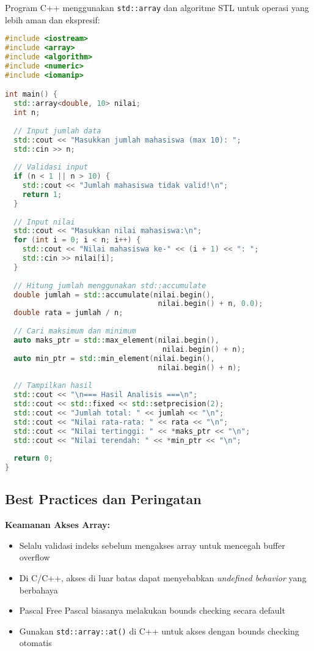 \documentclass[../main.tex]{subfiles}
\begin{document}
Program C++ menggunakan \texttt{std::array} dan algoritme STL untuk operasi yang lebih aman dan ekspresif:

\begin{lstlisting}[language=C++, caption={Program lengkap array 1D di C++}]
#include <iostream>
#include <array>
#include <algorithm>
#include <numeric>
#include <iomanip>

int main() {
  std::array<double, 10> nilai;
  int n;
  
  // Input jumlah data
  std::cout << "Masukkan jumlah mahasiswa (max 10): ";
  std::cin >> n;
  
  // Validasi input
  if (n < 1 || n > 10) {
    std::cout << "Jumlah mahasiswa tidak valid!\n";
    return 1;
  }
  
  // Input nilai
  std::cout << "Masukkan nilai mahasiswa:\n";
  for (int i = 0; i < n; i++) {
    std::cout << "Nilai mahasiswa ke-" << (i + 1) << ": ";
    std::cin >> nilai[i];
  }
  
  // Hitung jumlah menggunakan std::accumulate
  double jumlah = std::accumulate(nilai.begin(), 
                                   nilai.begin() + n, 0.0);
  double rata = jumlah / n;
  
  // Cari maksimum dan minimum
  auto maks_ptr = std::max_element(nilai.begin(), 
                                    nilai.begin() + n);
  auto min_ptr = std::min_element(nilai.begin(), 
                                   nilai.begin() + n);
  
  // Tampilkan hasil
  std::cout << "\n=== Hasil Analisis ===\n";
  std::cout << std::fixed << std::setprecision(2);
  std::cout << "Jumlah total: " << jumlah << "\n";
  std::cout << "Nilai rata-rata: " << rata << "\n";
  std::cout << "Nilai tertinggi: " << *maks_ptr << "\n";
  std::cout << "Nilai terendah: " << *min_ptr << "\n";
  
  return 0;
}
\end{lstlisting}

\subsection{Best Practices dan Peringatan}

\textbf{Keamanan Akses Array:}
\begin{itemize}
  \item Selalu validasi indeks sebelum mengakses array untuk mencegah buffer overflow
  \item Di C/C++, akses di luar batas dapat menyebabkan \textit{undefined behavior} yang berbahaya
  \item Pascal Free Pascal biasanya melakukan bounds checking secara default
  \item Gunakan \texttt{std::array::at()} di C++ untuk akses dengan bounds checking otomatis
\end{itemize}
\end{document}
